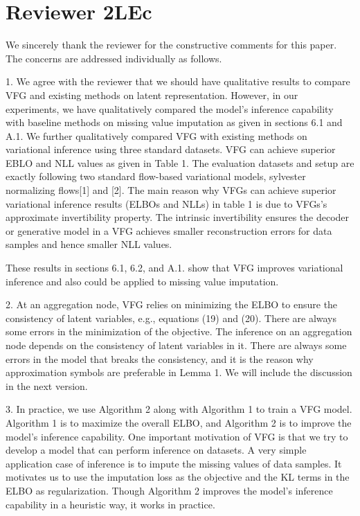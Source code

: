 \documentclass{article}
\begin{document}
\section{Reviewer 2LEc}
We sincerely thank the reviewer for the constructive comments for this paper. The concerns are addressed individually as follows. 

1. We agree with the reviewer that we should have qualitative results to compare VFG and existing methods on latent representation. 
However, in our experiments,  we have qualitatively compared the model's inference capability with baseline methods on missing value imputation as given in sections 6.1 and A.1.  We further qualitatively compared VFG with existing methods on variational inference using three standard datasets. VFG can achieve superior EBLO and NLL values as given in Table 1. The evaluation datasets and setup are exactly following two standard flow-based variational models, sylvester normalizing flows[1] and [2].  The main reason why VFGs can achieve superior variational inference results (ELBOs and  NLLs) in table 1 is due to VFGs's approximate invertibility property. The intrinsic invertibility ensures the decoder or generative model in a VFG  achieves smaller reconstruction errors for data samples and hence smaller NLL values.

These results in sections  6.1, 6.2, and A.1. show that VFG improves variational inference and also could be applied to missing value imputation. 

2. At an aggregation node, VFG relies on minimizing the ELBO to ensure the consistency of latent variables, e.g., equations (19) and (20).  There are always some errors in the minimization of the objective. 
The inference on an aggregation node depends on the consistency of latent variables in it. There are always some errors in the model that breaks the consistency, and it is the reason why approximation symbols are preferable in Lemma 1. We will include the discussion in the next version.

3.  In practice, we use Algorithm 2 along with Algorithm 1 to train a VFG model.  Algorithm 1 is to maximize the overall ELBO, and Algorithm 2 is to improve the model's inference capability. One important motivation of VFG is that we try to develop a model that can perform inference on datasets. A very simple application case of inference is to impute the missing values of data samples.  It motivates us to use the imputation loss as the objective and the KL terms in the ELBO as regularization. 
 Though Algorithm 2 improves the model's inference capability in a heuristic way, it works in practice.
\end{document}
